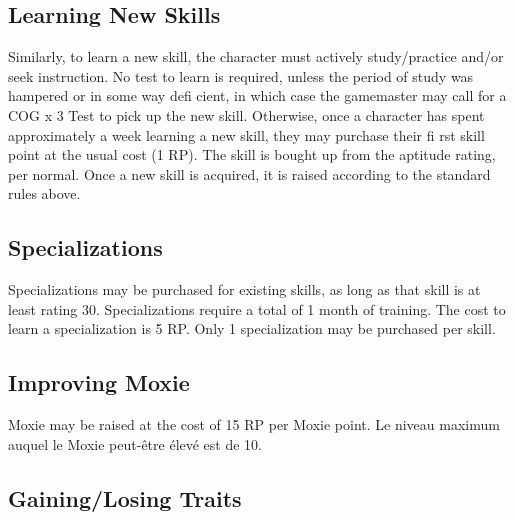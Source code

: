 \subsection{Learning New Skills} \label{sec:learning-new-skills} 

Similarly, to learn a new skill, the character must actively study/practice and/or seek instruction. No test to learn is required, unless the period of study was hampered or in some way defi cient, in which case the gamemaster may call for a COG x 3 Test to pick up the new skill. Otherwise, once a character has spent approximately a week learning a new skill, they may purchase their fi rst skill point at the usual cost (1 RP). The skill is bought up from the aptitude rating, per normal. Once a new skill is acquired, it is raised according to the standard rules above. 

\subsection{Specializations} \label{sec:new-specializations} Specializations may be purchased for existing skills, as long as that skill is at least rating 30. Specializations require a total of 1 month of training. The cost to learn a specialization is 5 RP. Only 1 specialization may be purchased per skill. 

\subsection{Improving Moxie} \label{sec:improving-moxie} 

Moxie may be raised at the cost of 15 RP per Moxie point. Le niveau maximum auquel le Moxie peut-être élevé est de 10. 

\subsection{Gaining/Losing Traits} \label{sec:gaining-losing-traits} 

